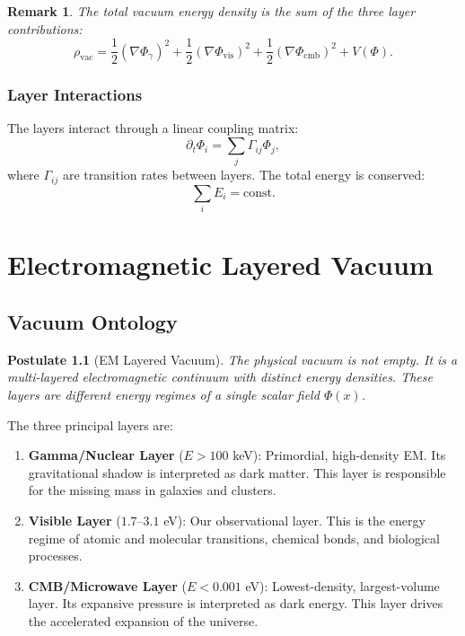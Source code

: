 \documentclass[12pt,oneside]{book}
\newtheorem{postulate}{Postulate}[chapter]
\newtheorem{remark}{Remark}[chapter]
\begin{document}
\begin{remark}
The total vacuum energy density is the sum of the three layer contributions:
\[
\rho_{\text{vac}} = \frac{1}{2} (\nabla \Phi_\gamma)^2 + \frac{1}{2} (\nabla \Phi_{\text{vis}})^2 + \frac{1}{2} (\nabla \Phi_{\text{cmb}})^2 + V(\Phi).
\]
\end{remark}

\subsection{Layer Interactions}

The layers interact through a linear coupling matrix:
\[
\partial_t \Phi_i = \sum_j \Gamma_{ij} \Phi_j,
\]
where $\Gamma_{ij}$ are transition rates between layers. The total energy is conserved:
\[
\sum_i E_i = \text{const}.
\]

\chapter{Electromagnetic Layered Vacuum}

\section{Vacuum Ontology}

\begin{postulate}[EM Layered Vacuum]
The physical vacuum is not empty. It is a multi-layered electromagnetic continuum with distinct energy densities. These layers are different energy regimes of a single scalar field $\Phi(x)$.
\end{postulate}

The three principal layers are:

\begin{enumerate}
    \item \textbf{Gamma/Nuclear Layer} ($E > 100$ keV): Primordial, high-density EM. Its gravitational shadow is interpreted as dark matter. This layer is responsible for the missing mass in galaxies and clusters.
    \item \textbf{Visible Layer} ($1.7$--$3.1$ eV): Our observational layer. This is the energy regime of atomic and molecular transitions, chemical bonds, and biological processes.
    \item \textbf{CMB/Microwave Layer} ($E < 0.001$ eV): Lowest-density, largest-volume layer. Its expansive pressure is interpreted as dark energy. This layer drives the accelerated expansion of the universe.
\end{enumerate}
\end{document}
